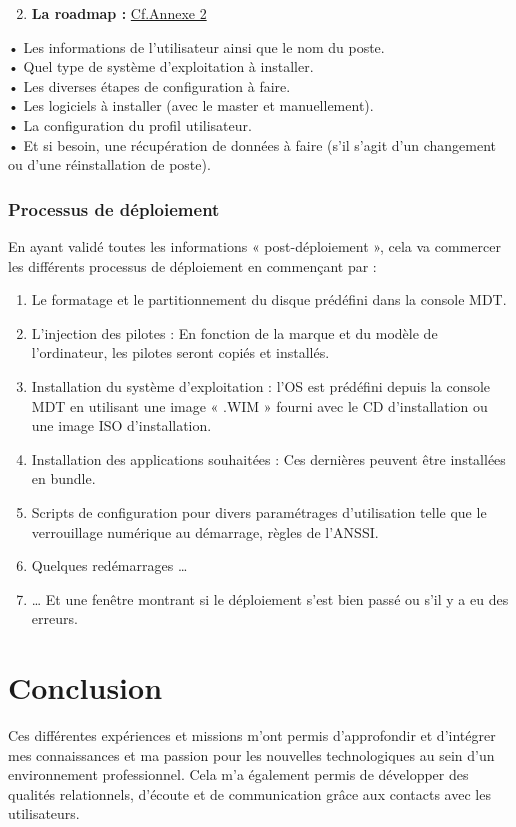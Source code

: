 \documentclass[11pt,a4paper,oneside]{article}
\begin{document}
\begin{enumerate}
\setcounter{enumi}{1}
    \item \textbf{La roadmap :} \hyperref[sec:Annexes]{Cf.Annexe \no{}2}
\end{enumerate}

•	Les informations de l’utilisateur ainsi que le nom du poste. \\
•	Quel type de système d’exploitation à installer.\\
•	Les diverses étapes de configuration à faire.\\
•	Les logiciels à installer (avec le master et manuellement).\\
•	La configuration du profil utilisateur.\\
•	Et si besoin, une récupération de données à faire (s'il s’agit d’un changement ou d’une réinstallation de poste).

\subsubsection{Processus de déploiement}
En ayant validé toutes les informations « post-déploiement », cela va commercer les différents processus de déploiement en commençant par : \\
\begin{enumerate}
    \item Le formatage et le partitionnement du disque prédéfini dans la console MDT.
    \item L’injection des pilotes : En fonction de la marque et du modèle de l’ordinateur, les pilotes seront copiés et installés.
    \item Installation du système d’exploitation : l’OS est prédéfini depuis la console MDT en utilisant une image « .WIM » fourni avec le CD d’installation ou une image ISO d’installation.
    \item Installation des applications souhaitées : Ces dernières peuvent être installées en bundle.
    \item Scripts de configuration pour divers paramétrages d’utilisation telle que le verrouillage numérique au démarrage, règles de l'ANSSI.
    \item Quelques redémarrages …
    \item … Et une fenêtre montrant si le déploiement s’est bien passé ou s’il y a eu des erreurs.
\end{enumerate}	

\newpage

\section{Conclusion}
Ces différentes expériences et missions m’ont permis d’approfondir et d’intégrer mes connaissances et ma passion pour les nouvelles technologiques au sein d’un environnement professionnel. Cela m’a également permis de développer des qualités relationnels, d’écoute et de communication grâce aux contacts avec les utilisateurs. \\
\end{document}
